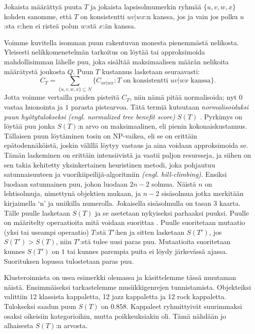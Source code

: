 \documentclass[12pt,finnish,final]{tktltiki2}
\theoremstyle{definition}
\theoremstyle{remark}
\newcommand{\engl}[1]{\emph{(engl. #1)}}
\begin{document}
    Jokaista määrättyä puuta $T$ ja jokaista lapsisolmumerkin ryhmää $\{u,v,w,x\}$ kohden sanomme, että $T$ on konsistentti $uv|wx$:n kanssa, jos ja vain jos polku $u$:sta $v$:hen ei risteä polun $w$:stä $x$:än kanssa.

    Voimme kuvitella isomman puun rakentuvan monesta pienemmästä nelikosta. Yleisesti nelikkomenetelmän tarkoitus on löytää tai approksimoida mahdollisimman lähelle puu, joka sisältää maksimaalisen määrän nelikoita määrätystä joukosta $Q$. Puun $T$ kustannus lasketaan seuraavasti:
    \[
      C_{T} = \sum_{\{u,v,w,x\}\subseteq N}\{C_{uv|wx}: T \text{ on konsistentti } uv|wx \text{ kanssa}\}.
    \]
    Jotta voimme vertailla puiden pisteitä $C_{T}$, niin nämä pitää normalisoida; nyt $0$ vastaa huonointa ja $1$ parasta pistearvoa. Tätä termiä kutsutaan \emph{normalisoiduksi puun hyötytulokseksi} \engl{normalized tree benefit score} $S(T)$ \cite{CV05}.
    Pyrkimys on löytää puu jonka $S(T)$:n arvo on maksimaalinen, eli pienin kokonaiskustannus.
    Tällaisen puun löytäminen tosin on NP-vaikea, eli se on erittäin epätodennäköistä, joskin välillä löytyy vastaus ja aina voidaan approksimoida se.
    Tämän laskeminen on erittäin intensiivistä ja vaatii paljon resursseja, ja siihen on sen takia kehitetty yksinkertainen heuristinen metodi, joka pohjautuu satunnaisuuteen ja vuorikiipeilijä-algoritmiin \engl{hill-climbing}.
    Ensiksi luodaan satunnainen puu, johon luodaan $2n-2$ solmua. Näistä $n$ on lehtisolmuja, nimettynä objektien mukaan, ja $n-2$ sisäsolmua jotka merkitään kirjaimella `n' ja uniikilla numerolla. Jokaisella sisäsolmulla on tasan 3 kaarta. Tälle puulle lasketaan $S(T)$ ja se asetetaan nykyiseksi parhaaksi puuksi. Puulle on määritelty operaatioita mitä voidaan suorittaa \cite{CV05}.
    Puulle suoritetaan mutaatio (yksi tai useampi operaatio) $T$:stä $T'$:hen ja sitten lasketaan $S(T')$, jos $S(T') > S(T)$, niin $T'$:stä tulee uusi paras puu. Mutaatioita suoritetaan kunnes $S(T')$ on $1$ tai kunnes parempia puita ei löydy järkevässä ajassa. Suorituksen lopussa tulostetaan paras puu.


    Klusteroinnista on usea esimerkki olemassa ja käsittelemme tässä muutaman näistä.
    Ensimmäiseksi tarkastelemme musiikkigenrejen tunnistamista.
    Objekteiksi valittiin 12 klassista kappaletta, 12 jazz kappaletta ja 12 rock kappaletta.
    Tulokseksi saadun puun $S(T)$ on $0.858$. Kappaleet ryhmittyivät suurimmaksi osaksi oikeisiin kategorioihin, mutta poikkeuksiakin oli.
    Tämä nähdään jo alhaisesta $S(T)$:n arvosta.
\end{document}

